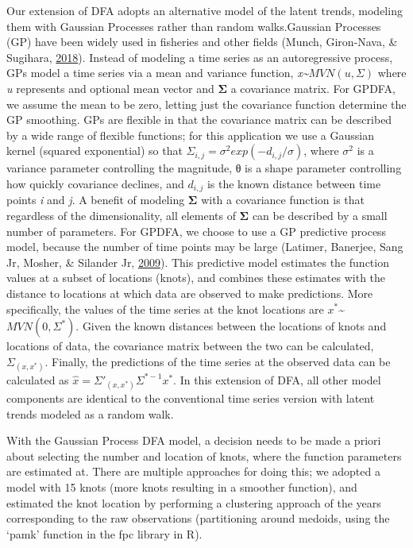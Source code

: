 \documentclass [11pt, proquest] {uwthesis}[2015/03/03]
\begin{document}
Our extension of DFA adopts an alternative model of the latent trends,
modeling them with Gaussian Processes rather than random walks.Gaussian
Processes (GP) have been widely used in fisheries and other fields
(Munch, Giron‐Nava, \& Sugihara,
\protect\hyperlink{ref-Munch2018}{2018}). Instead of modeling a time
series as an autoregressive process, GPs model a time series via a mean
and variance function, \emph{x\textasciitilde{}}\(MVN(u,\Sigma)\) where
\emph{u} represents and optional mean vector and \textbf{Σ} a covariance
matrix. For GPDFA, we assume the mean to be zero, letting just the
covariance function determine the GP smoothing. GPs are flexible in that
the covariance matrix can be described by a wide range of flexible
functions; for this application we use a Gaussian kernel (squared
exponential) so that \(\Sigma_{i,j}=\sigma^2 exp(-d_{i,j}/\sigma)\),
where \(\sigma^2\) is a variance parameter controlling the magnitude, θ
is a shape parameter controlling how quickly covariance declines, and
\(d_{i,j}\) is the known distance between time points \emph{i} and
\emph{j}. A benefit of modeling \textbf{Σ} with a covariance function is
that regardless of the dimensionality, all elements of \textbf{Σ} can be
described by a small number of parameters. For GPDFA, we choose to use a
GP predictive process model, because the number of time points may be
large (Latimer, Banerjee, Sang Jr, Mosher, \& Silander Jr,
\protect\hyperlink{ref-Latimer2009}{2009}). This predictive model
estimates the function values at a subset of locations (knots), and
combines these estimates with the distance to locations at which data
are observed to make predictions. More specifically, the values of the
time series at the knot locations are
\(x^*\)\textasciitilde{}\(MVN(0,\Sigma^*)\). Given the known distances
between the locations of knots and locations of data, the covariance
matrix between the two can be calculated, \(\Sigma_{(x,x^*)}\). Finally,
the predictions of the time series at the observed data can be
calculated as \(\hat{x}=\Sigma'_{(x,x^*)}\Sigma^{*-1}x^*\). In this
extension of DFA, all other model components are identical to the
conventional time series version with latent trends modeled as a random
walk.

With the Gaussian Process DFA model, a decision needs to be made a
priori about selecting the number and location of knots, where the
function parameters are estimated at. There are multiple approaches for
doing this; we adopted a model with 15 knots (more knots resulting in a
smoother function), and estimated the knot location by performing a
clustering approach of the years corresponding to the raw observations
(partitioning around medoids, using the `pamk' function in the fpc
library in R).
\end{document}
